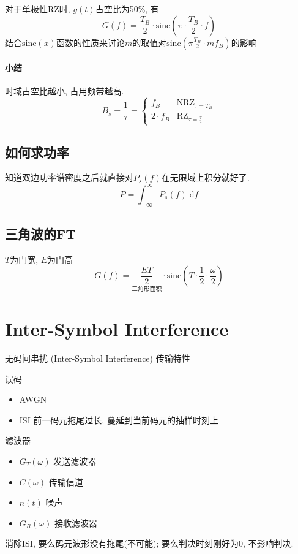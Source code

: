\documentclass[a4paper]{report}
\begin{document}
对于单极性RZ时, $g(t)$占空比为50\%, 有
\begin{equation}
  G(f)=\frac{T_B}{2}\cdot \text{sinc}(\pi\cdot \frac{T_B}{2} \cdot f)
\end{equation}
结合$\text{sinc}(x)$函数的性质来讨论$m$的取值对$\text{sinc}(\pi \frac{T_B}{2}\cdot mf_B)$的影响

\paragraph{小结}
时域占空比越小, 占用频带越高. 
$$B_s=\frac{1}{\tau}=\begin{cases}
  f_B&\text{NRZ}_{\tau=T_B}
  \\ 2\cdot f_B&\text{RZ}_{\tau=\frac{\tau}{2}}
\end{cases}$$
\subsection{如何求功率}
知道双边功率谱密度之后就直接对$P_s(f)$在无限域上积分就好了. 
\begin{equation}
  P=\int_{-\infty}^{\infty}P_s(f)\;\text{d}f
\end{equation}
\subsection{三角波的FT}
$T$为门宽, $E$为门高
\begin{equation}
  G(f)=\underset{\text{三角形面积}}{\frac{ET}{2}}\cdot \text{sinc}(T \cdot\frac{1}{2}\cdot\frac{\omega}{2})
\end{equation}
\section{Inter-Symbol Interference}
无码间串扰 (Inter-Symbol Interference) 传输特性

误码
\begin{itemize}
  \item AWGN
  \item ISI 前一码元拖尾过长, 蔓延到当前码元的抽样时刻上
\end{itemize}
滤波器
\begin{itemize}
  \item $G_T(\omega)$ 发送滤波器
  \item $C(\omega)$ 传输信道
  \item $n(t)$ 噪声
  \item $G_R(\omega)$ 接收滤波器
\end{itemize}
消除ISI, 要么码元波形没有拖尾(不可能); 要么判决时刻刚好为0, 不影响判决. 
\end{document}
